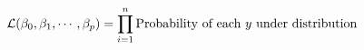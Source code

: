 \documentclass[preview]{standalone}
\begin{document}
\begin{align*}
\special{dvisvgm:raw <g id='unique000'>}\mathcal{L}(\beta_0, \beta_1, \cdots, \beta_p)=\prod^n_{i=1}\text{Probability of each }y\text{ under distribution}\special{dvisvgm:raw </g>}
\end{align*}
\end{document}
